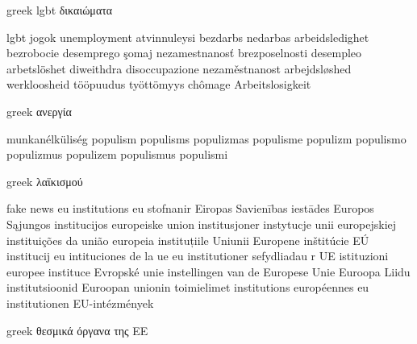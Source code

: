 \begin{multicols}{3}
{\begin{otherlanguage*}{greek}
lgbt δικαιώματα
\end{otherlanguage*}
lgbt jogok
unemployment
atvinnuleysi
bezdarbs
nedarbas
arbeidsledighet
bezrobocie
desemprego
şomaj
nezamestnanosť
brezposelnosti
desempleo
arbetslöshet
diweithdra
disoccupazione
nezaměstnanost
arbejdsløshed
werkloosheid
tööpuudus
työttömyys
chômage
Arbeitslosigkeit
\begin{otherlanguage*}{greek}
ανεργία
\end{otherlanguage*}
munkanélküliség
populism
populisms
populizmas
populisme
populizm
populismo
populizmus
populizem
populismus
populismi
\begin{otherlanguage*}{greek}
λαϊκισμού
\end{otherlanguage*}
fake news
eu institutions
eu stofnanir
Eiropas Savienības iestādes
Europos Sąjungos institucijos
europeiske union institusjoner
instytucje unii europejskiej
instituições da união europeia
instituțiile Uniunii Europene
inštitúcie EÚ
institucij eu
intituciones de la ue
eu institutioner
sefydliadau r UE
istituzioni europee
instituce Evropské unie
instellingen van de Europese Unie
Euroopa Liidu institutsioonid
Euroopan unionin toimielimet
institutions européennes
eu institutionen
EU-intézmények
\begin{otherlanguage*}{greek}
θεσμικά όργανα της ΕΕ
\end{otherlanguage*}}
\end{multicols}
